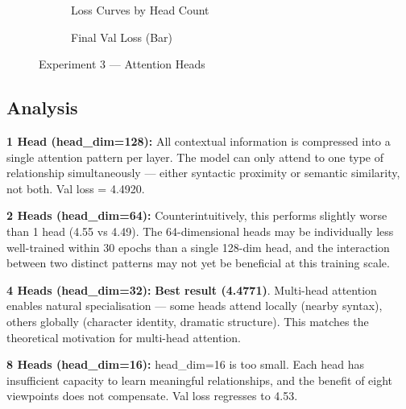 \documentclass[12pt,a4paper]{article}
\begin{document}
\begin{figure}[H]
  \centering
  \begin{subfigure}{0.60\textwidth}
    \caption{Loss Curves by Head Count}
  \end{subfigure}
  \hfill
  \begin{subfigure}{0.36\textwidth}
    \caption{Final Val Loss (Bar)}
  \end{subfigure}
  \caption{Experiment 3 — Attention Heads}
\end{figure}

\subsection{Analysis}

\textbf{1 Head (head\_dim=128):} All contextual information is compressed into a single attention pattern per layer. The model can only attend to one type of relationship simultaneously — either syntactic proximity or semantic similarity, not both. Val loss = 4.4920.

\textbf{2 Heads (head\_dim=64):} Counterintuitively, this performs slightly worse than 1 head (4.55 vs 4.49). The 64-dimensional heads may be individually less well-trained within 30 epochs than a single 128-dim head, and the interaction between two distinct patterns may not yet be beneficial at this training scale.

\textbf{4 Heads (head\_dim=32):} \textbf{Best result (4.4771)}. Multi-head attention enables natural specialisation — some heads attend locally (nearby syntax), others globally (character identity, dramatic structure). This matches the theoretical motivation for multi-head attention.

\textbf{8 Heads (head\_dim=16):} head\_dim=16 is too small. Each head has insufficient capacity to learn meaningful relationships, and the benefit of eight viewpoints does not compensate. Val loss regresses to 4.53.
\end{document}
